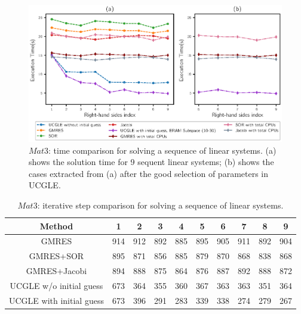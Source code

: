 \begin{figure}[htbp]
	\centering
	\includegraphics[width=6.4in]{fig/seqrhs2.eps}
	\caption{$Mat3$: time comparison for solving a sequence of linear systems. (a) shows the solution time for 9 sequent linear systems; (b) shows the cases extracted from (a) after the good selection of parameters in UCGLE.}
	\label{fig:seqrhs2}
\end{figure}

\begin{table}[htbp]
	\small
	\label{tb2}
	\caption{$Mat3$: iterative step comparison for solving a sequence of linear systems.}
	\centering
	\renewcommand{\arraystretch}{1.6}
	\begin{tabular}{c*{9}{c}}
		\toprule
		\cellcolor{gray!50}Method              & \cellcolor{gray!50}1 &  \cellcolor{gray!50}2 &  \cellcolor{gray!50}3 &  \cellcolor{gray!50}4 &  \cellcolor{gray!50}5  &  \cellcolor{gray!50}6  & \cellcolor{gray!50}7 & \cellcolor{gray!50}8 & \cellcolor{gray!50}9\\
		\midrule
		GMRES & 914 & 912 & 892 &885  & 895 & 905  &911&892& 904\\
		\cellcolor{gray!20}GMRES+SOR            & 	\cellcolor{gray!20}895 & 	\cellcolor{gray!20}871 & 	\cellcolor{gray!20}856 & 	\cellcolor{gray!20}885 & 	\cellcolor{gray!20}879 & 	\cellcolor{gray!20}870 &	\cellcolor{gray!20}868&	\cellcolor{gray!20}838&	\cellcolor{gray!20}868\\
		GMRES+Jacobi            & 894 & 888 & 875 & 864 & 876 & 887 &892&888&872\\
			\cellcolor{gray!20}UCGLE w/o initial guess     & 	\cellcolor{gray!20}673 & 	\cellcolor{gray!20}364 & 	\cellcolor{gray!20}355 & 	\cellcolor{gray!20}360 & 	\cellcolor{gray!20}367 &	\cellcolor{gray!20}363 &	\cellcolor{gray!20}363&	\cellcolor{gray!20}351& 	\cellcolor{gray!20}364\\
		UCGLE with initial guess     & 673 & 396 & 291 & 283 & 339 & 338  & 274 & 279 & 267\\
		\hline
	\end{tabular}
\end{table}

